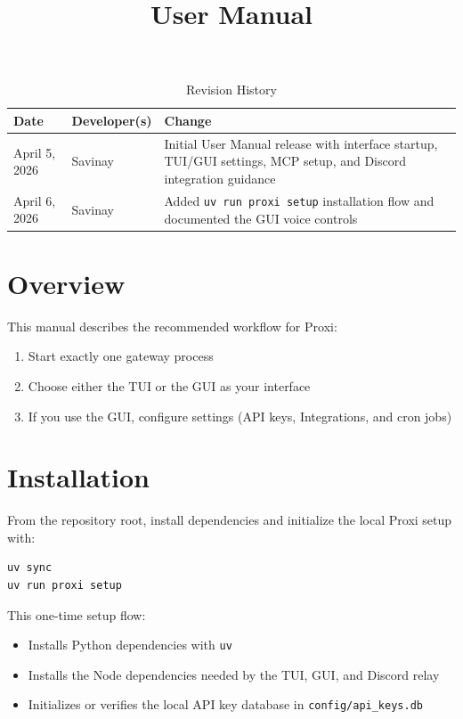 \documentclass{article}
\title{User Manual\\\progname}
\author{\authname}
\date{}
\begin{document}
\setlength{\parindent}{0pt}

\begin{table}[hp]
\caption{Revision History} \label{TblRevisionHistory}
\begin{tabularx}{\textwidth}{llX}
\toprule
\textbf{Date} & \textbf{Developer(s)} & \textbf{Change}\\
\midrule
April 5, 2026 & Savinay & Initial User Manual release with interface startup, TUI/GUI settings, MCP setup, and Discord integration guidance\\
April 6, 2026 & Savinay & Added \texttt{uv run proxi setup} installation flow and documented the GUI voice controls\\
\bottomrule
\end{tabularx}
\end{table}

\newpage

\maketitle

\newpage

\section{Overview}

This manual describes the recommended workflow for Proxi:
\begin{enumerate}
	\item Start exactly one gateway process
	\item Choose either the TUI or the GUI as your interface
	\item If you use the GUI, configure settings (API keys, Integrations, and cron jobs)
\end{enumerate}

\section{Installation}

From the repository root, install dependencies and initialize the local Proxi setup with:

\begin{verbatim}
uv sync
uv run proxi setup
\end{verbatim}

This one-time setup flow:

\begin{itemize}
	\item Installs Python dependencies with \texttt{uv}
	\item Installs the Node dependencies needed by the TUI, GUI, and Discord relay
	\item Initializes or verifies the local API key database in \texttt{config/api\_keys.db}
\end{itemize}
\end{document}
